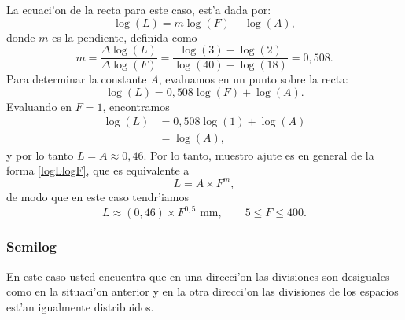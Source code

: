 La ecuaci'on de la recta para este caso, est'a dada por:
\begin{equation}\label{logLlogF}
\log(L)=m\log(F)+\log(A),
\end{equation}
donde $m$ es la pendiente, definida como 
\begin{equation}
m=\frac{\Delta\log(L)}{\Delta\log(F)}=\frac{\log(3)-\log(2)}{\log(40)-\log(18)}=0,508.
\end{equation}
Para determinar la constante $A$, evaluamos en un punto sobre la recta:
\begin{equation}
\log(L)=0,508\log(F)+\log(A).
\end{equation}
Evaluando en $F=1$, encontramos
\begin{align}
\log(L) &= 0,508\log(1)+\log(A) \\
&= \log(A),
\end{align}
y por lo tanto $L=A\approx 0,46$. Por lo tanto, muestro ajute es en general de la forma \eqref{logLlogF}, que es equivalente a
\begin{equation}
L=A\times F^m,
\end{equation}
de modo que en este caso tendr'iamos
\begin{equation}
L\approx (0,46)\times F^{0,5} \text{ mm}, \qquad 5\le F\le 400.
\end{equation}

\subsubsection{Semilog}
En este caso usted encuentra que en una direcci'on las divisiones son desiguales como en la situaci'on anterior y en la otra direcci'on las divisiones de los espacios est'an igualmente distribuidos.

